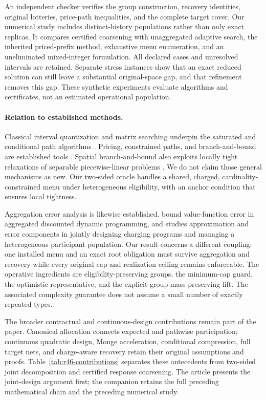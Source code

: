 An independent checker verifies the group construction, recovery identities, original lotteries, price-path inequalities, and the complete target cover. Our numerical study includes distinct-history populations rather than only exact replicas. It compares certified coarsening with unaggregated adaptive search, the inherited priced-prefix method, exhaustive menu enumeration, and an uneliminated mixed-integer formulation. All declared cases and unresolved intervals are retained. Separate stress instances show that an exact reduced solution can still leave a substantial original-space gap, and that refinement removes this gap. These synthetic experiments evaluate algorithms and certificates, not an estimated operational population.

\paragraph{Relation to established methods.}\label{sec:r37-position}
Classical interval quantization and matrix searching underpin the saturated and conditional path algorithms \citep{Wu1991,NielsenNock2014,GronlundEtAl2017}. Pricing, constrained paths, and branch-and-bound are established tools \citep{HandlerZang1980,LawlerWood1966,Lemarechal2001}. Spatial branch-and-bound also exploits locally tight relaxations of separable piecewise-linear problems \citep{HubnerEtAl2025}. We do not claim those general mechanisms as new. Our two-sided oracle handles a shared, charged, cardinality-constrained menu under heterogeneous eligibility, with an anchor condition that ensures local tightness.

Aggregation error analysis is likewise established. \citet{LiBertsekas2025} bound value-function error in aggregated discounted dynamic programming, and \citet{Fattahi2025} studies approximation and error components in jointly designing charging programs and managing a heterogeneous participant population. Our result concerns a different coupling: one installed menu and an exact root obligation must survive aggregation and recovery while every original cap and realization ceiling remains enforceable. The operative ingredients are eligibility-preserving groups, the minimum-cap guard, the optimistic representative, and the explicit group-mass-preserving lift. The associated complexity guarantee does not assume a small number of exactly repeated types.

The broader contractual and continuous-design contributions remain part of the paper. Canonical allocation connects expected and pathwise participation; continuous quadratic design, Monge acceleration, conditional compression, full target nets, and charge-aware recovery retain their original assumptions and proofs. Table~\ref{tab:r46-contributions} separates these antecedents from two-sided joint decomposition and certified response coarsening. The article presents the joint-design argument first; the companion retains the full preceding mathematical chain and the preceding numerical study.
